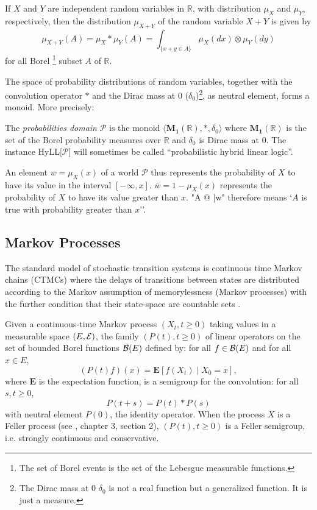 \documentclass{article}
\begin{document}
\begin{fact}
\label{fact:convolution}
If $X$ and $Y$ are independent random variables in $\mathbb{R}$, with distribution $\mu_X$ and $\mu_Y$, respectively, then the distribution $\mu_{X+Y}$ of the random variable $X+Y$ is given by
$$
\mu_{X+Y}(A)=\mu_X*\mu_Y(A)=\int_{\{x+y\in A\}}\mu_X(dx)\otimes\mu_Y(dy)
$$
for all Borel
\footnote{The set of Borel events is the set of the Lebesgue measurable functions.}
 subset $A$ of $\mathbb{R}$. 
\end{fact}

The space of probability distributions of random variables, together with the convolution operator $*$ and the Dirac mass at 0 ($\delta_0$)\footnote{
The Dirac mass at 0 $\delta_0$ is not a real function but a generalized function. 
It is just a measure.
},
as neutral element, forms a monoid. More precisely:

\begin{defn}
\label{defn:proba}
  The \emph{probabilities domain} $\mathcal{P}$ is the monoid 
  $\langle \mathbf{M_1}(\mathbb{R}),\ast, \delta_0 \rangle$ where 
  $\mathbf{M_1}(\mathbb{R})$ is the set of the 
  Borel probability measures over $\mathbb{R}$ and $\delta_0$ is Dirac mass at 0.
  The instance HyLL[$\mathcal{P}$] will sometimes be called 
  ``probabilistic hybrid linear logic''.
\end{defn}

An element $w= \mu_X(x)$ of a world $\mathcal{P}$ thus represents the probability of 
$X$ to have its value in the interval $[- \infty, x]$.
$\bar{w} = 1-\mu_X(x)$ represents the probability of $X$ to have its value greater than 
$x$.
"A @ \bar{w}" therefore means `$A$ is true with probability greater than $x$''.

\subsection{Markov Processes}

The standard model of stochastic transition systems is continuous time Markov chains (CTMCs)
where the delays of transitions between states are distributed according to the Markov 
assumption of memorylessness (Markov processes)
with the further condition that their state-space are countable sets 
\cite{Rogers-Williams-vol1-book}.

\begin{fact}
\label{fact:feller}
Given a continuous-time Markov process $(X_t,t\geq 0)$ taking values in a measurable space $(E,{\cal E})$, the family $(P(t),t\geq 0)$ of linear operators on the set of bounded Borel functions ${\cal B}(E)$ defined by: for all $f\in{\cal B}(E)$ and for all $x\in E$,
$$
(P(t)f)(x)  
           = \mathbf{E}[f(X_t)\mid X_0=x],
$$
where ${\mathbf E}$ is the expectation function,
is a semigroup for the convolution: for all $s,t\geq 0$,
$$
P(t+s) = P(t) * P(s)
$$
with neutral element $P(0)$, the identity operator. When the process $X$ is a Feller process (see \cite{Rogers-Williams-vol1-book}, chapter 3, section 2), $(P(t),t\geq 0)$ is a Feller semigroup, i.e. strongly continuous and conservative.
\end{fact}
\end{document}
